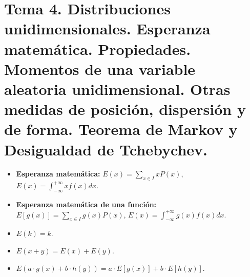 \documentclass[oneside,spanish,a4paper]{article}
\newcommand{\sectioncol}[1]{\section{{\color{blue} #1}}}
\begin{document}
\sectioncol{Tema 4. Distribuciones unidimensionales. Esperanza matem\'atica. Propiedades. Momentos de una variable aleatoria unidimensional. Otras medidas de posici\'on, dispersi\'on y de forma. Teorema de Markov y Desigualdad de Tchebychev.}
\begin{itemize}
\item \textbf{Esperanza matem\'atica:} $E(x)=\sum_{x\in I}xP(x)$, $E(x)=\int_{-\infty}^{+\infty}xf(x)dx$.
\item \textbf{Esperanza matem\'atica de una funci\'on:} $E[g(x)]=\sum_{x\in I}g(x)P(x)$, $E(x)=\int_{-\infty}^{+\infty}g(x)f(x)dx$.
\item $E(k)=k$.
\item $E(x+y)=E(x)+E(y)$.
\item $E(a\cdot g(x)+b\cdot h(y))=a\cdot E[g(x)]+b\cdot E[h(y)]$.


\end{itemize}
\end{document}
